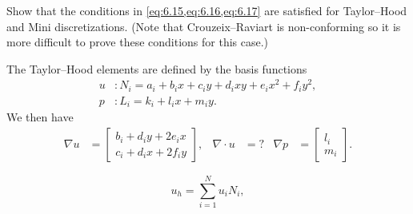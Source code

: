 \begin{exercise}{6.2}
    Show that the conditions in \cref{eq:6.15,eq:6.16,eq:6.17} are satisfied for Taylor--Hood and Mini discretizations. %
    (Note that Crouzeix--Raviart is non-conforming so it is more difficult to prove these conditions for this case.) %
\end{exercise}

\begin{solution}{6.2}
    The Taylor--Hood elements are defined by the basis functions %
    \begin{equation}
        \begin{split}
            u &: N_i = a_i + b_i x + c_i y + d_i x y + e_i x^2 + f_i y^2, \\
            p &: L_i = k_i + l_i x + m_i y.
        \end{split}
    \end{equation}
    We then have
    \begin{align*}
        \nabla u &=
        \begin{bmatrix}
            b_i + d_i y + 2 e_i x \\
            c_i + d_i x + 2 f_i y
        \end{bmatrix},
        &
        \nabla \cdot u &= ?
        &
        \nabla p &=
        \begin{bmatrix}
            l_i \\
            m_i
        \end{bmatrix}.
    \end{align*}

    \begin{equation}
        u_h = \sum_{i = 1}^{N} u_i N_i,
    \end{equation}
\end{solution}